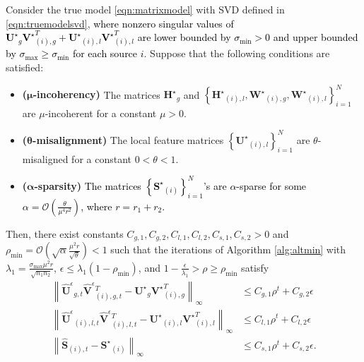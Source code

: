 \documentclass[twoside,11pt]{article}
\newcommand{\revise}[1]{\textcolor{black}{ #1}}
\newcommand{\norm}[1]{\left\lVert#1\right\rVert}
\newcommand{\matHst}{{\mathbf{H}^\star}}
\newcommand{\matM}{\mathbf{M}}
\newcommand{\matSst}{{\mathbf{S}^\star}}
\newcommand{\matUst}{{\mathbf{U}^\star}}
\newcommand{\matVst}{{\mathbf{V}^\star}}
\newcommand{\matWst}{{\mathbf{W}^\star}}
\newcommand{\hmatS}{\hat{\mathbf{S}}}
\newcommand{\hmatU}{\hat{\mathbf{U}}}
\newcommand{\hmatV}{\hat{\mathbf{V}}}
\newcommand{\hmatUeps}{\hat{\mathbf{U}}^{\epsilon}{}}
\newcommand{\hmatVeps}{\hat{\mathbf{V}}^{\epsilon}{}}
\newcommand{\gop}{\sigma_{\max}}
\newcommand{\sm}{\sigma_{\min}}
\newcommand{\rhom}{\rho_{\min}}
\begin{document}
\begin{theorem}
\label{thm:recovery}
Consider the true model \eqref{eqn:matrixmodel} with SVD defined in \eqref{eqn:truemodelsvd}, \revise{where nonzero singular values of $\matUst_g\matVst_{(i),g}^T+\matUst_{(i),l}\matVst_{(i),l}^T$ are lower bounded by $\sm>0$ and upper bounded by $\gop\ge \sm$ for each source $i$}. Suppose that the following conditions are satisfied:
\begin{itemize}
    \item {\bf ($\pmb{\mu}$-incoherency)} The matrices $\matHst_g$ and $\left\{\matHst_{(i),l},\matWst_{(i),g}, \matWst_{(i),l}\right\}_{i=1}^N$ are $\mu$-incoherent for a constant $\mu>0$. 
    \item {\bf ($\pmb{\theta}$-misalignment)} The local feature matrices $\left\{\matUst_{(i),l}\right\}_{i=1}^N$ are $\theta$-misaligned for a constant $0<\theta<1$.
    \item {\bf ($\pmb{\alpha}$-sparsity)} \revise{The matrices $\left\{\matSst_{(i)}\right\}_{i=1}^N$'s are $\alpha$-sparse for some $\alpha = \mathcal{O}\left(\frac{\theta}{\mu^4r^2}\right)$, where $r=r_1+r_2$.}
\end{itemize}
Then, there exist constants $C_{g,1}, C_{g,2}, C_{l,1}, C_{l,2}, C_{s,1}, C_{s,2}>0$ and $\rhom=\mathcal{O}\left(\sqrt{\alpha}\frac{\mu^2r}{\sqrt{\theta}}\right)<1$ such that the iterations of Algorithm \ref{alg:altmin} with $\lambda_1= \frac{\gop \mu^2r}{\sqrt{n_1n_2}}$, $\epsilon\le \lambda_1\left(1-\rhom\right)$, and $1-\frac{\epsilon}{\lambda_1}>\rho\ge\rhom$ satisfy
\begin{align}
    \label{eqn:convergenceonlg}
\norm{\hmatUeps_{g,t}\hmatVeps_{(i),g,t}^T-\matUst_{g}\matVst_{(i),g}^T}_{\infty}&\leq  C_{g,1}\rho^t+C_{g,2}\epsilon%
\\
\label{eqn:convergenceonll}
\norm{\hmatUeps_{(i),l,t}\hmatVeps_{(i),l,t}^T-\matUst_{(i),l}\matVst_{(i),l}^T}_{\infty} &\leq  C_{l,1}\rho^t+C_{l,2}\epsilon%
\\
\label{eqn:convergenceons}
\norm{\hmatS_{(i),t}-\matSst_{(i)}}_{\infty}&\leq  C_{s,1}\rho^t+C_{s,2}\epsilon.%
\end{align}
\end{theorem}
\end{document}
